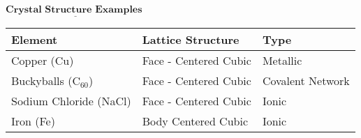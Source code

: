 \documentclass{article}
\begin{document}
		
		\pagebreak
	\vspace{2cm}

			\begin{qq}
	
	\begin{center}
		
		$\underline{\textbf{Crystal Structure Examples }}$
		\vspace{3pt}
		
		\begin{tabular}{lll}
			\hline
			Element & Lattice Structure & Type \\ 
			\hline
			Copper (Cu) & Face - Centered  Cubic & Metallic \\
			Buckyballs (C$_60$) & Face - Centered Cubic & Covalent Network \\
			Sodium Chloride (NaCl)& Face - Centered Cubic & Ionic \\
			Iron (Fe) & Body Centered Cubic & Ionic \\
			
			
			
			


		\end{tabular}
	\end{center}
	
	
\end{qq}

\vspace{5pt}
\end{document}

